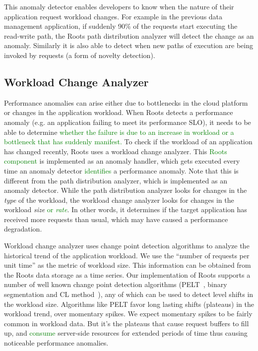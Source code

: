 This anomaly detector enables developers to know when the nature of their application request
workload changes. For example in the previous data management application, if suddenly 90\%
of the requests start executing the read-write path, the Roots path distribution analyzer will
detect the change as an anomaly. Similarly it is also able to detect when new paths of execution
are being invoked by requests (a form of novelty detection).

\subsection{Workload Change Analyzer}

Performance anomalies can arise either due to bottlenecks in the cloud platform or 
changes in the application workload.
When Roots detects a performance anomaly (e.g. an application failing to meet its performance SLO),
it needs to be able to determine \textcolor{green}{whether the failure is due
to an increase in workload or a bottleneck that has suddenly manifest.}
To check if the workload of an application has changed recently, Roots uses a workload change analyzer.
This \textcolor{green}{Roots component}  is implemented as an anomaly handler, which gets executed every time an 
anomaly detector
\textcolor{green}{identifies} a performance anomaly. Note that this is different from the path distribution analyzer,
which is implemented as an anomaly detector. While the path distribution analyzer looks for changes in the
\textit{type} of the workload, the workload change analyzer looks for changes
in the workload \textit{size} \textcolor{green}{or \textit{rate}}. 
In other words, it determines if the target application has received more requests than usual, which
may have caused a performance degradation.

Workload change analyzer uses change point detection algorithms to analyze the historical trend of 
the application workload. We use the ``number of requests
per unit time'' as the metric of workload size. This information can be obtained from the Roots
data storage as a time series. Our implementation of Roots supports a number of well known change point
detection algorithms (PELT~\cite{doi:10.1080/01621459.2012.737745}, binary segmentation 
and CL method~\cite{chen1993joint}), any of which can be used to detect level shifts in the
workload size. Algorithms like PELT favor long lasting shifts (plateaus) in the workload trend, over momentary spikes.
We expect momentary spikes to be fairly common in workload data. But it's the plateaus that cause
request buffers to fill up, and 
\textcolor{green}{consume}
server-side resources for extended periods of time thus
causing noticeable performance anomalies.

